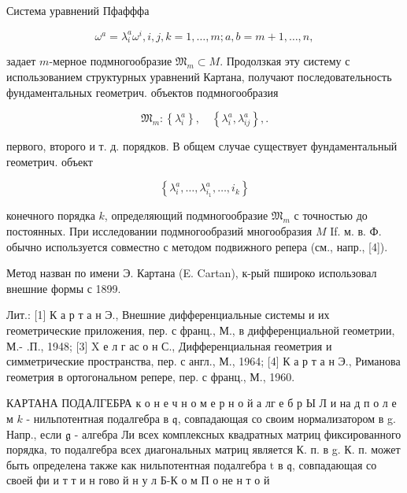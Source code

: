 \documentclass[10pt]{article}
\begin{document}
Система уравнений Пфафффа



\[

\omega^{a}=\lambda_{i}^{a} \omega^{i}, i, j, k=1, \ldots, m ; a, b=m+1, \ldots, n,

\]



задает $m$-мерное подмногообразие $\mathfrak{M}_{m} \subset M$. Продолзкая эту систему с использованием структурных уравнений Картана, получают последовательность фундаментальных геометрич. объектов подмногообразия



\[

\mathfrak{M}_{m}:\left\{\lambda_{i}^{a}\right\}, \quad\left\{\lambda_{i}^{a}, \lambda_{i j}^{a}\right\}, .

\]



первого, второго и т. д. порядков. В общем случае существует фундаментальный геометрич. объект



\[

\left\{\lambda_{i}^{a}, \ldots, \lambda_{i_{1}}^{a}, \ldots, i_{k}\right\}

\]



конечного порядка $k$, определяющий подмногообразие $\mathfrak{M}_{m}$ с точностью до постоянных. При исследовании подмногообразий многообразия $M$ If. м. в. Ф. обычно используется совместно с методом подвижного репера (см., напр., [4]).



Метод назван по имени Э. Картана (E. Cartan), к-рый пшироко использовал внешние формы с 1899.



Лит.: [1] К а р т а н Э., Внешние дифференциальные системы и их геометрические приложения, пер. с франц., М., в дифференциальной геометрии, М.- .П., 1948; [3] X е л г ас о н С., Дифференциальная геометрия и симметрические пространства, пер. с англ., М., 1964; [4] К а р т а н Э., Риманова геометрия в ортогональном репере, пер. с франц., М., 1960.



КАРТАНА ПОДАЛГЕБРА к о н е ч н о м е р н о й а лг е б р Ы Л и на д п о л е м $k$ - нильпотентная подалгебра в $\mathfrak{q}$, совпадающая со своим нормализатором в g. Напр., если $\mathfrak{g}$ - алгебра Ли всех комплексных квадратных матриц фиксированного порядка, то подалгебра всех диагональных матриц является К. п. в g. К. п. может быть определена также как нильпотентная подалгебра $\mathrm{t}$ в $\mathfrak{q}$, совпадающая со своей фи и т т и н гово й н у л Б-К о м П о не н т о й
\end{document}
